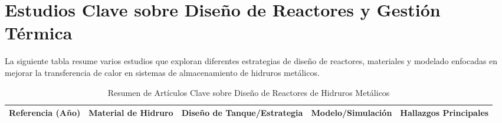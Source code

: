 \documentclass{article}
\begin{document}
\section{Estudios Clave sobre Diseño de Reactores y Gestión Térmica}

La siguiente tabla resume varios estudios que exploran diferentes estrategias de diseño de reactores, materiales y modelado enfocadas en mejorar la transferencia de calor en sistemas de almacenamiento de hidruros metálicos.

\begin{table}[!ht]
\centering
\caption{Resumen de Artículos Clave sobre Diseño de Reactores de Hidruros Metálicos}
\label{tab:resumen_hidruros}

\begin{tabular}{>{\raggedright}m{2.5cm}|>{\raggedright}m{2.5cm}|>{\raggedright}m{3.5cm}|>{\raggedright}m{2.5cm}|>{\raggedright\arraybackslash}m{4cm}}
\toprule
\textbf{Referencia (Año)} & \textbf{Material de Hidruro} & \textbf{Diseño de Tanque/Estrategia} & \textbf{Modelo/Simulación} & \textbf{Hallazgos Principales} \\
\midrule


\end{tabular}
\end{table}
\end{document}
